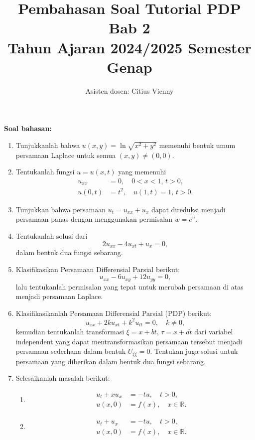\documentclass{article}
\title{Pembahasan Soal Tutorial PDP Bab 2 \\
Tahun Ajaran 2024/2025 Semester Genap}
\author{Asisten dosen: Citius Vienny}
\begin{document}
\maketitle

\noindent

\noindent
\textbf{Soal bahasan:}
\begin{enumerate}  
\item Tunjukkanlah bahwa \( u(x,y) = \ln \sqrt{x^2 + y^2} \) memenuhi bentuk umum persamaan Laplace untuk semua \((x,y) \neq (0,0)\).  

\item Tentukanlah fungsi \( u = u(x,t) \) yang memenuhi  
\begin{align*}  
u_{xx} &= 0, \quad 0 < x < 1, \, t > 0, \\  
u(0,t) &= t^2, \quad u(1,t) = 1, \, t > 0.  
\end{align*}  

\item Tunjukkan bahwa persamaan \( u_t = u_{xx} + u_x \) dapat direduksi menjadi persamaan panas dengan menggunakan permisalan \( w = e^{u} \).  

\item Tentukanlah solusi dari  
\[  
2u_{xx} - 4u_{xt} + u_x = 0,  
\]  
dalam bentuk dua fungsi sebarang.  

\item Klasifikasikan Persamaan Differensial Parsial berikut:  
\[  
u_{xx} - 6u_{xy} + 12u_{yy} = 0,  
\]  
lalu tentukanlah permisalan yang tepat untuk merubah persamaan di atas menjadi persamaan Laplace.  

\item Klasifikasikanlah Persamaan Differensial Parsial (PDP) berikut:  
\[  
u_{xx} + 2ku_{xt} + k^2 u_{tt} = 0, \quad k \neq 0,  
\]  
kemudian tentukanlah transformasi \(\xi = x + bt\), \(\tau = x + dt\) dari variabel independent yang dapat mentransformasikan persamaan tersebut menjadi persamaan sederhana dalam bentuk \( U_{\xi\xi} = 0 \). Tentukan juga solusi untuk persamaan yang diberikan dalam bentuk dua fungsi sebarang.  

\item Selesaikanlah masalah berikut:  
\begin{enumerate}  
\item  
\begin{align*}  
u_t + xu_x &= -tu, \quad t > 0, \\  
u(x,0) &= f(x), \quad x \in \mathbb{R}.  
\end{align*}  
\item  
\begin{align*}  
u_t + u_x &= -tu, \quad t > 0, \\  
u(x,0) &= f(x), \quad x \in \mathbb{R}.  
\end{align*}  
\end{enumerate}  


\end{enumerate}
\end{document}
